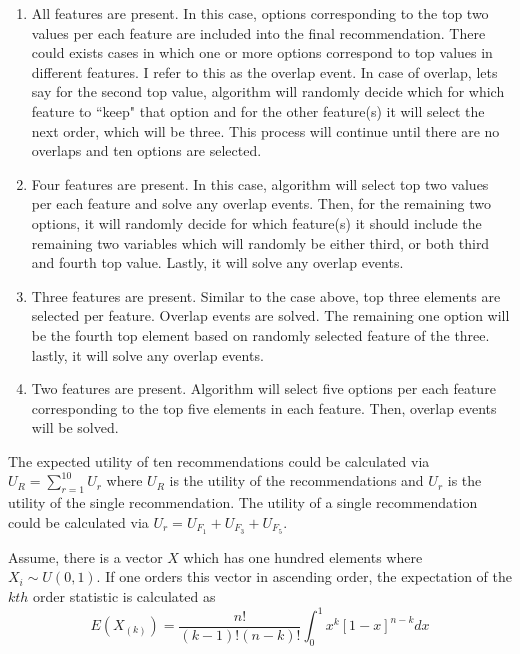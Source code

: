 \documentclass[a4paper,12pt]{article}
\begin{document}
\begin{enumerate}
    \item  All features are present. In this case, options corresponding to the top two values per each feature are included into the final recommendation. There could exists cases in which one or more options correspond to top values in different features. I refer to this as the overlap event. In case of overlap, lets say for the second top value, algorithm will randomly decide which for which feature to ``keep" that option and for the other feature(s) it will select the next order, which will be three. This process will continue until there are no overlaps and ten options are selected.
    \item  Four features are present. In this case, algorithm will select top two values per each feature and solve any overlap events. Then, for the remaining two options, it will randomly decide for which feature(s) it should include the remaining two variables which will randomly be either third, or both third and fourth top value. Lastly, it will solve any overlap events.
    \item  Three features are present. Similar to the case above, top three elements are selected per feature. Overlap events are solved. The remaining one option will be the fourth top element based on randomly selected feature of the three. lastly, it will solve any overlap events.
    \item  Two features are present. Algorithm will select five options per each feature corresponding to the top five elements in each feature. Then, overlap events will be solved.
\end{enumerate}


The expected utility of ten recommendations could be calculated via $U_R = \sum_{r = 1}^{10}{U_r}$ where $U_R$ is the utility of the recommendations and $U_r$ is the utility of the single recommendation. The utility of a single recommendation could be calculated via $U_r = U_{F_1} + U_{F_3} + U_{F_5}$.

Assume, there is a vector $X$ which has one hundred elements  where $X_i\sim U\left(0,1\right)$. If one orders this vector in ascending order, the expectation of the $kth$ order statistic is calculated as
$$
E\left(X_{\left(k\right)}\right)=\frac{n!}{\left(k-1\right)!\left(n-k\right)!}\int_{0}^{1}{x^k\left[1-x\right]^{n-k}dx}
$$
\end{document}
